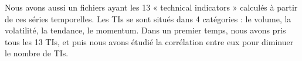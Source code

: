Nous avons aussi un fichiers ayant les 13 « technical indicators » calculés à partir de ces séries temporelles. Les TIs se sont situés dans 4 catégories : le volume, la volatilité, la tendance, le momentum. Dans un premier temps, nous avons pris tous les 13 TIs, et puis nous avons étudié la corrélation entre eux pour diminuer le nombre de TIs. 